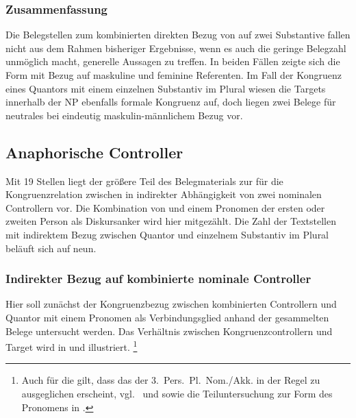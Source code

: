 \subsubsection{Zusammenfassung}

Die Belegstellen zum kombinierten direkten Bezug von \mbox{} auf
zwei Substantive fallen nicht aus dem Rahmen bisheriger Ergebnisse, wenn es
auch die geringe Belegzahl unmöglich macht, generelle Aussagen zu treffen. In
beiden Fällen zeigte sich die Form  mit Bezug auf maskuline und
feminine Referenten. Im Fall der Kongruenz eines Quantors mit einem einzelnen
Substantiv im Plural wiesen die Targets innerhalb der NP
ebenfalls formale Kongruenz auf, doch liegen zwei Belege
für neutrales  bei eindeutig maskulin-männlichem Bezug vor.

\subsection{Anaphorische Controller}

Mit 19 Stellen liegt der größere Teil des Belegmaterials zur \KC{} für die
Kongruenzrelation zwischen  in indirekter Abhängigkeit von zwei
nominalen Controllern vor. Die Kombination von  und einem
Pronomen der ersten oder zweiten Person als
Diskurs\-anker wird hier mitgezählt. Die Zahl der Textstellen
mit indirektem Bezug zwischen Quantor und einzelnem Substantiv im Plural
beläuft sich auf neun.

\subsubsection{Indirekter Bezug auf kombinierte nominale Controller}
\label{subsubssec:iconomctrlpers}

Hier soll zunächst der Kongruenzbezug zwischen kombinierten Controllern und
Quantor mit einem Pronomen als Verbindungsglied anhand der gesammelten Belege
untersucht werden. Das Verhältnis zwischen Kongruenzcontrollern und Target wird
in  und  illustriert.%
%
	\footnote{Auch für die \KC{} gilt, dass das  der
		3.~Pers.\ Pl.\ Nom./Akk. in der Regel zu  ausgeglichen
		erscheint,
		vgl.~\citet[213--214]{paul2007} und \citet[369, 390--397]{ksw2} sowie
		die Teiluntersuchung zur Form des Pronomens in
		.}

